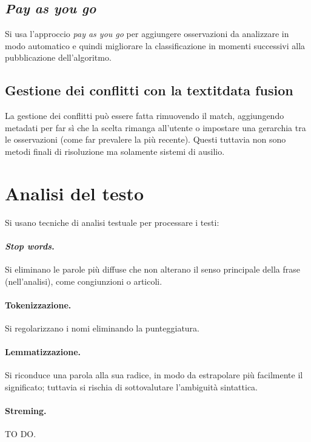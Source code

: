 \documentclass[11pt]{article}
\begin{document}
\subsection{\textit{Pay as you go}}
Si usa l'approccio \textit{pay as you go} per aggiungere osservazioni da analizzare in modo automatico e quindi migliorare la classificazione in momenti successivi alla pubblicazione dell'algoritmo.

\subsection{Gestione dei conflitti con la textit{data fusion}}
La gestione dei conflitti può essere fatta rimuovendo il match, aggiungendo metadati per far sì che la scelta rimanga all'utente o impostare una gerarchia tra le osservazioni (come far prevalere la più recente).
Questi tuttavia non sono metodi finali di risoluzione ma solamente sistemi di ausilio.

\section{Analisi del testo}
Si usano tecniche di analisi testuale per processare i testi:

\paragraph{\textit{Stop words}.}
Si eliminano le parole più diffuse che non alterano il senso principale della frase (nell'analisi), come congiunzioni o articoli.

\paragraph{Tokenizzazione.}
Si regolarizzano i nomi eliminando la punteggiatura.

\paragraph{Lemmatizzazione.}
Si riconduce una parola alla sua radice, in modo da estrapolare più facilmente il significato; tuttavia si rischia di sottovalutare l'ambiguità sintattica.

\paragraph{Streming.}
TO DO.
\newline
\end{document}
